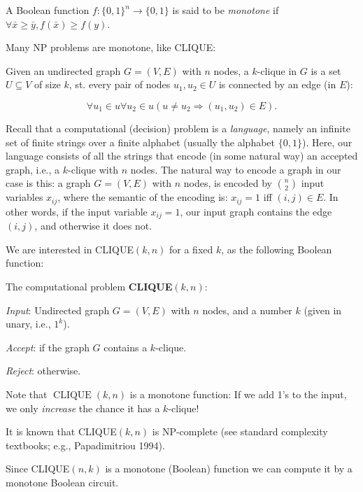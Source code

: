 \begin{definition}
A Boolean function $f:\{0,1\}^n \rightarrow\{0,1\}$ is said to be  \emph{monotone} if $\forall \bar{x} \geq \bar{y}, f(\bar{x}) \geq f(y)$.
\end{definition}


Many NP problems are monotone, like CLIQUE:

Given an undirected graph $G=(V, E)$ with $n$ nodes, a $k$-clique in $G$ is a set $U\subseteq V$ of size $k$, st. every pair of nodes $u_1, u_2 \in U$ is connected by an edge (in $E$):

$$
 \forall u_1 \in u \forall u_2 \in u ( u \neq u_2\Rightarrow (u_1, u_2)\in E).
$$


Recall that a computational (decision) problem is a \emph{language}, namely an infinite set of finite strings over a finite alphabet (usually the alphabet $\{0,1\}$). Here, our language consists of all the strings that encode (in some natural way) an accepted graph, i.e., a $k$-clique with $n$ nodes.
The natural way to encode a graph in our case is this: a graph  $G=(V, E) $ with $n$ nodes, is encoded by $\binom{n}{2}$ input variables  $x_{ij}$, where the semantic of the encoding is: $x_{i j}=1$ iff $(i, j) \in E$. In other words, if the input variable $x_{ij}=1$,   our input graph contains the edge $(i,j)$, and otherwise it does not. 

We are interested in CLIQUE$(k, n)$ for a fixed $k$, as the following Boolean function: 
\begin{svgraybox}
The computational problem \textbf{CLIQUE$(k, n)$}: 

\textit{Input}: Undirected graph $G=(V,E)$ with $n$ nodes, and a number $k$ (given in unary, i.e., $1^k$).

\textit{Accept}: if the graph $G$ contains a $k$-clique. 

\textit{Reject}: otherwise.
\end{svgraybox}


 Note that $\operatorname{CLIQUE}(k, n)$ is a monotone function: If we add 1's to the input, we only \emph{increase} the chance it has a $k$-clique!
 
It is known that CLIQUE$(k,n)$ is NP-complete (see standard complexity textbooks; e.g., Papadimitriou 1994).


Since CLIQUE$(n, k)$ is a monotone (Boolean)
function we can compute it by a monotone Boolean circuit.

